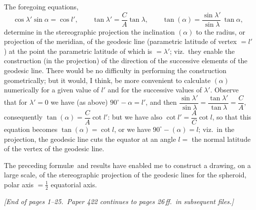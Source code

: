 \documentclass[11pt,a4paper]{article}
\begin{document}
The foregoing equations,
\[
\cos\lambda'\sin\alpha = \cos l', \qquad
\tan\lambda' = \frac{C}{A}\tan\lambda, \qquad
\tan(\alpha) = \frac{\sin\lambda'}{\sin\lambda}\,\tan\alpha,
\]
determine in the stereographic projection the inclination $(\alpha)$ to the
radius, or projection of the meridian, of the geodesic line (parametric
latitude of vertex $= l'$) at the point the parametric latitude of which is
$= \lambda'$; viz.\ they enable the construction (in the projection) of the
direction of the successive elements of the geodesic line.  There would be no
difficulty in performing the construction geometrically; but it would, I
think, be more convenient to calculate $(\alpha)$ numerically for a given
value of $l'$ and for the successive values of $\lambda'$.  Observe that for
$\lambda' = 0$ we have (as above) $90^\circ - \alpha = l'$, and then
$\dfrac{\sin\lambda'}{\sin\lambda} = \dfrac{\tan\lambda'}{\tan\lambda}
= \dfrac{C}{A}$, consequently $\tan(\alpha) = \dfrac{C}{A}\cot l'$: but we
have also $\cot l' = \dfrac{A}{C}\cot l$, so that this equation becomes
$\tan(\alpha) = \cot l$, or we have $90^\circ - (\alpha) = l$; viz.\ in the
projection, the geodesic line cuts the equator at an angle $l =$ the normal
latitude of the vertex of the geodesic line.

The preceding formul\ae\ and results have enabled me to construct a drawing,
on a large scale, of the stereographic projection of the geodesic lines for
the spheroid, polar axis $= \tfrac{1}{2}$ equatorial axis.

\begin{flushright}
\textit{[End of pages 1--25.\ Paper 422 continues to pages 26\,ff.\ in
subsequent files.]}
\end{flushright}
\end{document}
